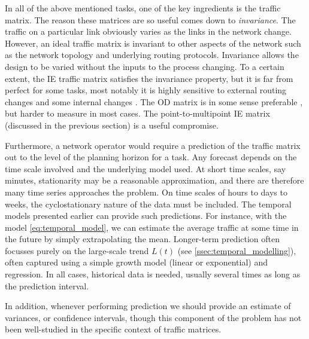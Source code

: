 In all of the above mentioned tasks, one of the key ingredients is the traffic
matrix. The reason these matrices are so useful comes down to {\em
  invariance}. The traffic on a particular link obviously varies as
the links in the network change. However, an ideal traffic matrix is
invariant to other aspects of the network such as the network topology
and underlying routing protocols. Invariance allows the design to be
varied without the inputs to the process changing.  To a certain
extent, the IE traffic matrix satisfies the invariance property, but
it is far from perfect for some tasks, most notably it is highly
sensitive to external routing changes and some internal changes
\cite{Teixeira05TMRoute,Teixeira04PotatoSIG}.  The OD matrix is in
some sense preferable \cite{Alderson06Topology}, but harder to measure
in most cases.  The point-to-multipoint IE matrix (discussed in the
previous section) is a useful compromise.

Furthermore, a network operator would require a prediction of the
traffic matrix out to the level of the planning horizon for a
task. Any forecast depends on the time scale involved and the
underlying model used. At short time scales, say minutes, stationarity
may be a reasonable approximation, and there are therefore many time
series approaches the problem. On time scales of hours to days to
weeks, the cyclostationary nature of the data must be included. The
temporal models presented earlier can provide such predictions.  For
instance, with the model \eqref{eq:temporal_model}, we can estimate
the average traffic at some time in the future by simply extrapolating
the mean. Longer-term prediction often focusses purely on the
large-scale trend $L(t)$ (see \autoref{ssec:temporal_modelling}), 
often captured using a simple growth model (linear 
or exponential) and regression. In all cases,
historical data is needed, usually several times as long as the
prediction interval.

In addition, whenever performing prediction we should provide an 
estimate of variances, or confidence intervals, though this component of the
problem has not been well-studied in the specific context of traffic
matrices. 



